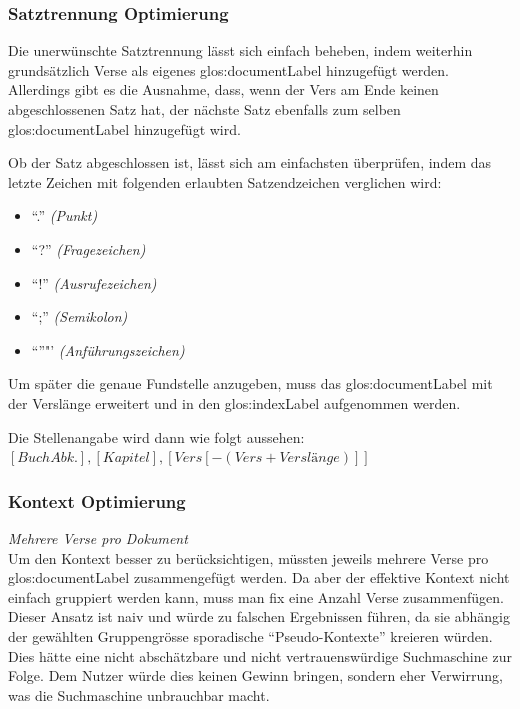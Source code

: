 \subsubsection{Satztrennung Optimierung}
Die unerwünschte Satztrennung lässt sich einfach beheben, indem weiterhin grundsätzlich Verse als eigenes \gls{glos:documentLabel} hinzugefügt werden.
Allerdings gibt es die Ausnahme, dass, wenn der Vers am Ende keinen abgeschlossenen Satz hat, der nächste Satz ebenfalls zum selben \gls{glos:documentLabel} hinzugefügt wird.

Ob der Satz abgeschlossen ist, lässt sich am einfachsten überprüfen, indem das letzte Zeichen mit folgenden erlaubten Satzendzeichen verglichen wird:
\begin{itemize}[noitemsep]
	\item "`."' \textit{(Punkt)}
	\item "`?"' \textit{(Fragezeichen)}
	\item "`!"' \textit{(Ausrufezeichen)}
	\item "`;"' \textit{(Semikolon)}
	\item "`"'"' \textit{(Anführungszeichen)}
\end{itemize}

Um später die genaue Fundstelle anzugeben, muss das \gls{glos:documentLabel} mit der Verslänge erweitert und in den \gls{glos:indexLabel} aufgenommen werden.

Die Stellenangabe wird dann wie folgt aussehen:\\
$[Buch Abk.], [Kapitel],[Vers[-(Vers + Verslänge)]]$

\subsubsection{Kontext Optimierung}
\label{sec:contextOptimaze}
\textit{Mehrere Verse pro Dokument}
\vspace{0.5em}\\
Um den Kontext besser zu berücksichtigen, müssten jeweils mehrere Verse pro \gls{glos:documentLabel} zusammengefügt werden.
Da aber der effektive Kontext nicht einfach gruppiert werden kann, muss man fix eine Anzahl Verse zusammenfügen.
Dieser Ansatz ist naiv und würde zu falschen Ergebnissen führen, da sie abhängig der gewählten Gruppengrösse sporadische "`Pseudo-Kontexte"' kreieren würden.
Dies hätte eine nicht abschätzbare und nicht vertrauenswürdige Suchmaschine zur Folge.
Dem Nutzer würde dies keinen Gewinn bringen, sondern eher Verwirrung, was die Suchmaschine unbrauchbar macht.

